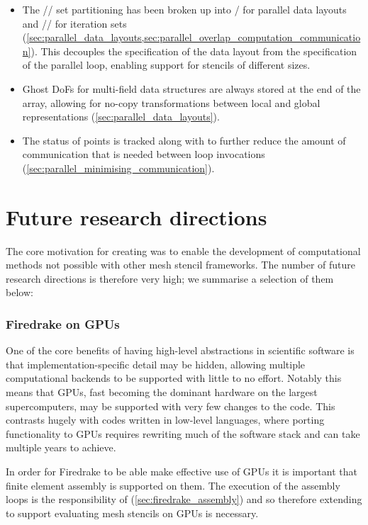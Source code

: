 \documentclass[thesis]{subfiles}
\begin{document}
\begin{itemize}
\begin{itemize}
      \item
        The \coreiter{}/\ownediter{}/\ghostiter{} set partitioning has been broken up into \ownediter{}/\ghostiter{} for parallel data layouts and \coreiter{}/\rootiter{}/\leafiter{} for iteration sets (\cref{sec:parallel_data_layouts,sec:parallel_overlap_computation_communication}).
        This decouples the specification of the data layout from the specification of the parallel loop, enabling support for stencils of different sizes.
      \item
        Ghost DoFs for multi-field data structures are always stored at the end of the array, allowing for no-copy transformations between local and global representations (\cref{sec:parallel_data_layouts}).
      \item
        The status of \rootiter{} points is tracked along with \leafiter{} to further reduce the amount of communication that is needed between loop invocations (\cref{sec:parallel_minimising_communication}).
    \end{itemize}
\end{itemize}

\section{Future research directions}
\label{sec:future_work}

The core motivation for creating  was to enable the development of computational methods not possible with other mesh stencil frameworks.
The number of future research directions is therefore very high; we summarise a selection of them below:

\subsubsection{Firedrake on GPUs}

One of the core benefits of having high-level abstractions in scientific software is that implementation-specific detail may be hidden, allowing multiple computational backends to be supported with little to no effort.
Notably this means that GPUs, fast becoming the dominant hardware on the largest supercomputers, may be supported with very few changes to the code.
This contrasts hugely with codes written in low-level languages, where porting functionality to GPUs requires rewriting much of the software stack and can take multiple years to achieve.

In order for Firedrake to be able make effective use of GPUs it is important that finite element assembly is supported on them.
The execution of the assembly loops is the responsibility of  (\cref{sec:firedrake_assembly}) and so therefore extending  to support evaluating mesh stencils on GPUs is necessary.
\end{document}
